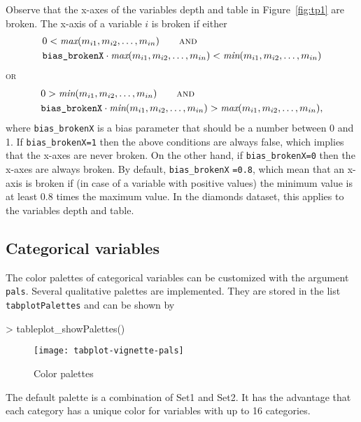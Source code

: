 \documentclass[11pt, fleqn, a4paper]{article}
\begin{document}
Observe that the x-axes of the variables depth and table in Figure~\ref{fig:tp1} are broken. The x-axis of a variable $i$ is broken if
either
\begin{align*}
& 0 < \textit{max}(m_{i1}, m_{i2},\ldots, m_{in}) \qquad \textsc{and}\\
& \mbox{{\tt bias\_brokenX}} \cdot \textit{max}(m_{i1}, m_{i2},\ldots, m_{in}) < \textit{min}(m_{i1}, m_{i2},\ldots, m_{in}) 
\end{align*}
\textsc{or}
\begin{align*}
& 0 > \textit{min}(m_{i1}, m_{i2},\ldots, m_{in}) \qquad \textsc{and}\\
& \mbox{{\tt bias\_brokenX}} \cdot \textit{min}(m_{i1}, m_{i2},\ldots, m_{in}) > \textit{max}(m_{i1}, m_{i2},\ldots, m_{in}),
\end{align*}
where {\tt bias\_brokenX} is a bias parameter that should be a number between 0 and 1. If {\tt bias\_brokenX=1} then the above conditions are always false, which implies that the x-axes are never broken. On the other hand, if {\tt bias\_brokenX=0} then the x-axes are always broken. By default, {\tt bias\_brokenX} {\tt=0.8}, which mean that an x-axis is broken if (in case of a variable with positive values) the minimum value is at least 0.8 times the maximum value. In the diamonds dataset, this applies to the variables depth and table.


\subsection{Categorical variables}
The color palettes of categorical variables can be customized with the argument {\tt pals}. Several qualitative palettes are implemented. They are stored in the list {\tt tabplotPalettes} and can be shown by

\begin{Schunk}
\begin{Sinput}
> tableplot_showPalettes()
\end{Sinput}
\end{Schunk}

\begin{figure}[htp]
\begin{center}
\texttt{[image: tabplot-vignette-pals]}
\end{center}
\caption{Color palettes}
\label{fig:pals}
\end{figure}

The default palette is a combination of Set1 and Set2. It has the advantage that each category has a unique color for variables with up to 16 categories.
\end{document}
